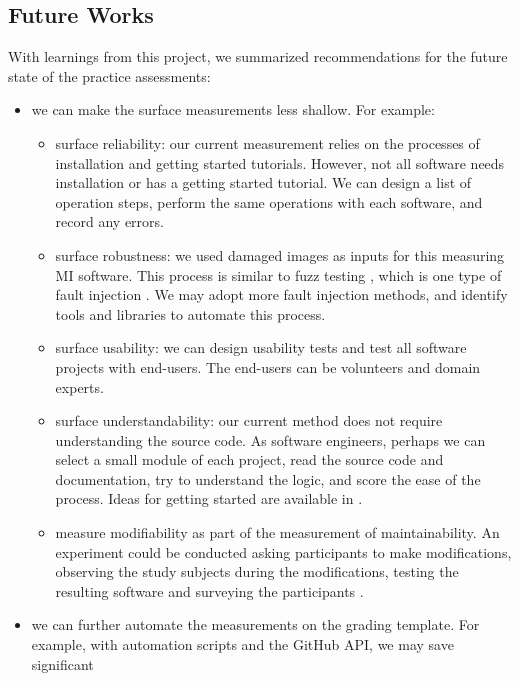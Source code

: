 \documentclass[final, 3p, times, authoryear]{elsarticle}
\begin{document}
\subsection{Future Works}

With learnings from this project, we summarized recommendations for the future
state of the practice assessments:
\begin{itemize}
    \item we can make the surface measurements less shallow. For example:
    \begin{itemize}
        \item surface reliability: our current measurement relies on
        the processes of installation and getting started tutorials. However,
        not all software needs installation or has a getting started tutorial.
        We can design a list of operation steps, perform the same operations
        with each software, and record any errors.
        \item surface robustness: we used damaged images as inputs for
        this measuring MI software. This process is similar to fuzz testing
        \citep{enwiki:1039424308}, which is one type of fault injection
        \citep{enwiki:1039005082}. We may adopt more fault injection methods, and
        identify tools and libraries to automate this process.
        \item surface usability: we can design usability tests and test
        all software projects with end-users. The end-users can be volunteers
        and domain experts.
        \item surface understandability: our current method does not require
        understanding the source code. As software engineers, perhaps we can
        select a small module of each project, read the source code and
        documentation, try to understand the logic, and score the ease of the
        process.  Ideas for getting started are available in
        \citet{SmithEtAl2021}.
        \item measure modifiability as part of the measurement of
        maintainability.  An experiment could be conducted asking participants
        to make modifications, observing the study subjects during the
        modifications, testing the resulting software and surveying the
        participants \citep{SmithEtAl2021}.
    \end{itemize}
	\item we can further automate the measurements on the grading template. For
	example, with automation scripts and the GitHub API, we may save significant

\end{itemize}
\end{document}
